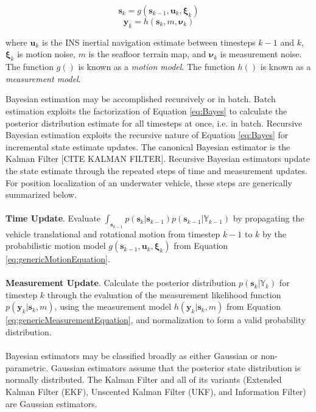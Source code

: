 \begin{equation}
\mathbf{s}_k = g(\mathbf{s}_{k-1}, \mathbf{u}_k, \mathbf{\xi}_k)
\label{eq:genericMotionEquation}
\end{equation}
\begin{equation}
\mathbf{y}_k = h(\mathbf{s}_k, m, \mathbf{\nu}_k)
\label{eq:genericMeasurementEquation}
\end{equation}

\noindent where $\mathbf{u}_k$ is the INS inertial navigation estimate between timesteps $k-1$ and $k$, $\mathbf{\xi}_k$ is motion noise, $m$ is the seafloor terrain map, and $\mathbf{\nu}_k$ is measurement noise. 
The function $g()$ is known as a \emph{motion model}.  
The function $h()$ is known as a \emph{measurement model}. 

Bayesian estimation may be accomplished recursively or in batch.  
Batch estimation exploits the factorization of Equation \ref{eq:Bayes} to calculate the posterior distribution estimate for all timesteps at once, i.e. in batch.
Recursive Bayesian estimation exploits the recursive nature of Equation \ref{eq:Bayes} for incremental state estimate updates.
The canonical Bayesian estimator is the Kalman Filter [CITE KALMAN FILTER].
Recursive Bayesian estimators update the state estimate through the repeated steps of time and measurement updates. 
For position localization of an underwater vehicle, these steps are generically summarized below.
\\ \\
\textbf{Time Update}. Evaluate $\int_{\textbf{s}_{k-1}} p(\textbf{s}_k | \textbf{s}_{k-1})p(\textbf{s}_{k-1}|\mathbb{Y}_{k-1}) $ by propagating the vehicle translational and rotational motion from timestep $k-1$ to $k$ by the probabilistic motion model $g(\mathbf{s}_{k-1}, \mathbf{u}_k, \mathbf{\xi}_k)$ from Equation \ref{eq:genericMotionEquation}. 
\\ \\
\textbf{Measurement Update}. Calculate the posterior distribution $p(\textbf{s}_k|\mathbb{Y}_k)$ for timestep $k$ through the evaluation of the measurement likelihood function $p(\mathbf{y}_k | \mathbf{s}_{k}, m)$, using the measurement model $h(\mathbf{y}_k | \mathbf{s}_k, m)$ from Equation \ref{eq:genericMeasurementEquation}, and normalization to form a valid probability distribution.
\\ \\
Bayesian estimators may be classified broadly as either Gaussian or non-parametric.
Gaussian estimators assume that the posterior state distribution is normally distributed.
The Kalman Filter and all of its variants (Extended Kalman Filter (EKF), Unscented Kalman Filter (UKF), and Information Filter) are Gaussian estimators.  

